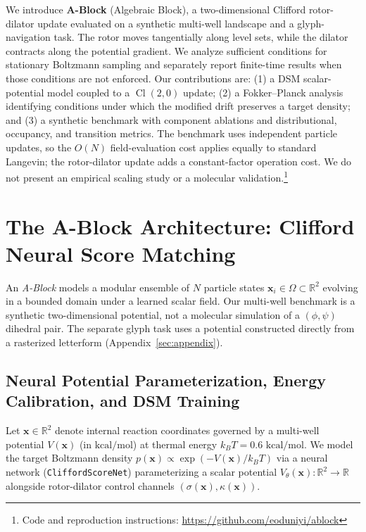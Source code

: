 \documentclass{article}
\begin{document}
We introduce \textbf{A-Block} (Algebraic Block), a two-dimensional Clifford rotor-dilator update evaluated on a synthetic multi-well landscape and a glyph-navigation task. The rotor moves tangentially along level sets, while the dilator contracts along the potential gradient. We analyze sufficient conditions for stationary Boltzmann sampling and separately report finite-time results when those conditions are not enforced. Our contributions are: (1) a DSM scalar-potential model coupled to a $\operatorname{Cl}(2,0)$ update; (2) a Fokker--Planck analysis identifying conditions under which the modified drift preserves a target density; and (3) a synthetic benchmark with component ablations and distributional, occupancy, and transition metrics. The benchmark uses independent particle updates, so the $O(N)$ field-evaluation cost applies equally to standard Langevin; the rotor-dilator update adds a constant-factor operation cost. We do not present an empirical scaling study or a molecular validation.\footnote{Code and reproduction instructions: \url{https://github.com/eoduniyi/ablock}}

\section{The A-Block Architecture: Clifford Neural Score Matching}

An \textit{A-Block} models a modular ensemble of $N$ particle states $\mathbf{x}_i \in \Omega \subset \mathbb{R}^2$ evolving in a bounded domain under a learned scalar field. Our multi-well benchmark is a synthetic two-dimensional potential, not a molecular simulation of a $(\phi,\psi)$ dihedral pair. The separate glyph task uses a potential constructed directly from a rasterized letterform (Appendix~\ref{sec:appendix}).

\subsection{Neural Potential Parameterization, Energy Calibration, and DSM Training}

Let $\mathbf{x} \in \mathbb{R}^2$ denote internal reaction coordinates governed by a multi-well potential $V(\mathbf{x})$ (in $\text{kcal/mol}$) at thermal energy $k_B T = 0.6\text{ kcal/mol}$. We model the target Boltzmann density $p(\mathbf{x}) \propto \exp(-V(\mathbf{x}) / k_B T)$ via a neural network (\texttt{CliffordScoreNet}) parameterizing a scalar potential $V_\theta(\mathbf{x}): \mathbb{R}^2 \to \mathbb{R}$ alongside rotor-dilator control channels $(\sigma(\mathbf{x}), \kappa(\mathbf{x}))$.
\end{document}
